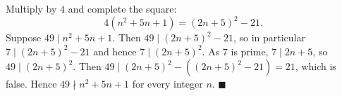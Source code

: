 Multiply by $4$ and complete the square:
\[
4\left(n^2+5n+1\right)=(2n+5)^2-21 .
\]
Suppose $49\mid n^2+5n+1$. Then $49\mid(2n+5)^2-21$, so in particular $7\mid(2n+5)^2-21$ and hence $7\mid(2n+5)^2$. As $7$ is prime, $7\mid2n+5$, so $49\mid(2n+5)^2$. Then $49\mid(2n+5)^2-\left((2n+5)^2-21\right)=21$, which is false. Hence $49\nmid n^2+5n+1$ for every integer $n$. $\blacksquare$
